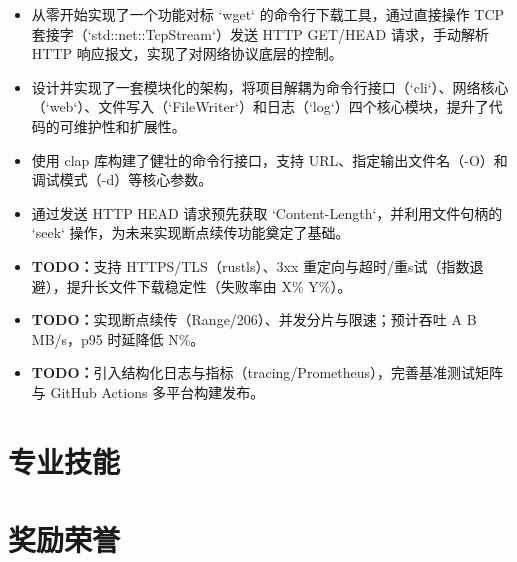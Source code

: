 \documentclass{resume}
\begin{document}
\begin{itemize}
  \item 从零开始实现了一个功能对标 `wget` 的命令行下载工具，通过直接操作 TCP 套接字（`std::net::TcpStream`）发送 HTTP GET/HEAD 请求，手动解析 HTTP 响应报文，实现了对网络协议底层的控制。
  \item 设计并实现了一套模块化的架构，将项目解耦为命令行接口（`cli`）、网络核心（`web`）、文件写入（`FileWriter`）和日志（`log`）四个核心模块，提升了代码的可维护性和扩展性。
  \item 使用 {clap} 库构建了健壮的命令行接口，支持 URL、指定输出文件名（{-O}）和调试模式（{-d}）等核心参数。
  \item 通过发送 HTTP HEAD 请求预先获取 `Content-Length`，并利用文件句柄的 `seek` 操作，为未来实现断点续传功能奠定了基础。
  \item \textbf{TODO：}支持 HTTPS/TLS（{rustls}）、3xx 重定向与超时/重s试（指数退避），提升长文件下载稳定性（失败率由 X\% \textrightarrow{} Y\%）。
  \item \textbf{TODO：}实现断点续传（Range/206）、并发分片与限速；预计吞吐 A \textrightarrow{} B MB/s，p95 时延降低 N\%。
  \item \textbf{TODO：}引入结构化日志与指标（{tracing}/Prometheus），完善基准测试矩阵与 GitHub Actions 多平台构建发布。
\end{itemize}




\section{专业技能}
\sepspace

\section{奖励荣誉}
\end{document}
